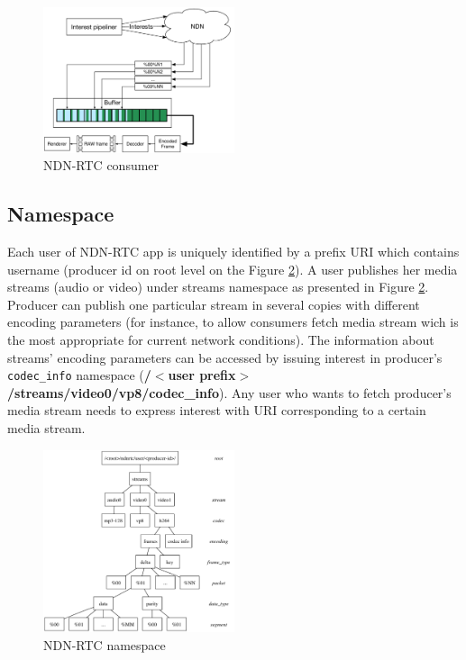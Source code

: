 \documentclass[10pt]{proc}
\begin{document}
\begin{figure}[Ht!]
\centering
\includegraphics[width=0.5\textwidth]{consumer}
\caption{NDN-RTC consumer}
\label{fig:consumer}
\end{figure}


\subsection{Namespace}

Each user of NDN-RTC app is uniquely identified by a prefix URI which contains username (producer id on root level on the Figure \ref{fig:namespace}). A user publishes her media streams (audio or video) under streams namespace as presented in Figure \ref{fig:namespace}. Producer can publish one particular stream in several copies with different encoding parameters (for instance, to allow consumers fetch media stream wich is the most appropriate for current network conditions). The information about streams’ encoding parameters can be accessed by issuing interest in producer's \texttt{codec\_info} namespace (\textbf{/$<$user prefix$>$/streams/video0/vp8/codec\_info}).
Any user who wants to fetch producer’s media stream needs to express interest with URI corresponding to a certain media stream.

\begin{figure}[Ht!]
\centering
\includegraphics[width=0.5\textwidth]{namespace}
\caption{NDN-RTC namespace}
\label{fig:namespace}
\end{figure}
\end{document}
